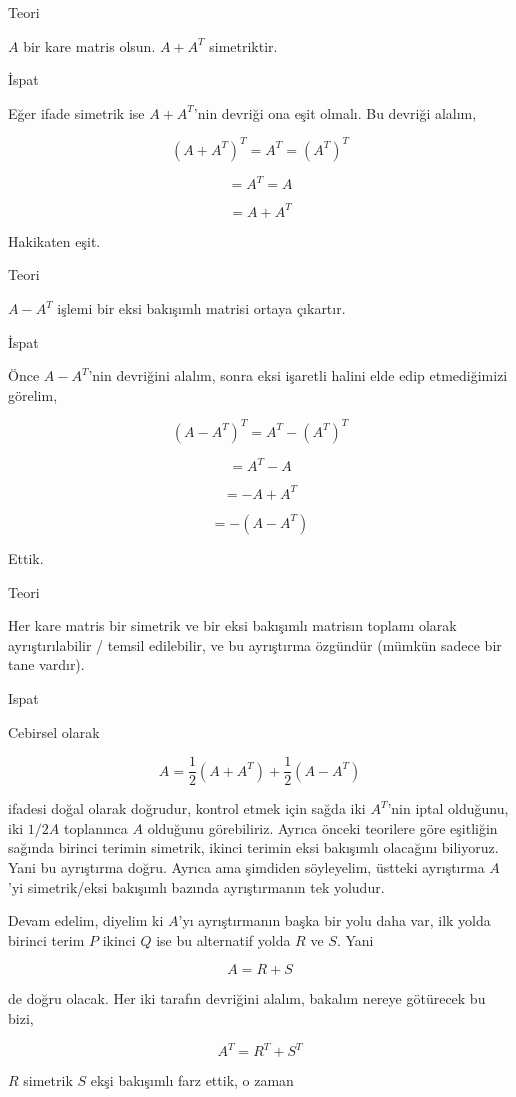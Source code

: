 \documentclass[12pt,fleqn]{article}\usepackage{../../common}
\begin{document}
Teori

$A$ bir kare matris olsun. $A + A^T$ simetriktir.

İspat

Eğer ifade simetrik ise $A + A^T$'nin devriği ona eşit olmalı. Bu devriği alalım,

$$
(A + A^T)^T = A^T = (A^T)^T
$$

$$
= A^T = A
$$

$$
= A + A^T
$$

Hakikaten eşit. 

Teori

$A - A^T$ işlemi bir eksi bakışımlı matrisi ortaya çıkartır.

İspat

Önce $A - A^T$'nin devriğini alalım, sonra eksi işaretli halini elde
edip etmediğimizi görelim,

$$
(A-A^T)^T = A^T - (A^T)^T
$$

$$
= A^T - A
$$

$$
= -A + A^T
$$

$$
= - (A-A^T)
$$

Ettik.

Teori

Her kare matris bir simetrik ve bir eksi bakışımlı matrisın toplamı olarak
ayrıştırılabilir / temsil edilebilir, ve bu ayrıştırma özgündür (mümkün sadece
bir tane vardır).

Ispat

Cebirsel olarak

$$
A = \frac{1}{2} (A + A^T) + \frac{1}{2} (A - A^T)
$$

ifadesi doğal olarak doğrudur, kontrol etmek için sağda iki $A^T$'nin iptal
olduğunu, iki $1/2 A$ toplanınca $A$ olduğunu görebiliriz. Ayrıca önceki
teorilere göre eşitliğin sağında birinci terimin simetrik, ikinci terimin eksi
bakışımlı olacağını biliyoruz. Yani bu ayrıştırma doğru. Ayrıca ama şimdiden
söyleyelim, üstteki ayrıştırma $A$'yi simetrik/eksi bakışımlı bazında
ayrıştırmanın tek yoludur.

Devam edelim, diyelim ki $A$'yı ayrıştırmanın başka bir yolu daha var, ilk yolda
birinci terim $P$ ikinci $Q$ ise bu alternatif yolda $R$ ve $S$. Yani

$$
A = R + S
$$

de doğru olacak. Her iki tarafın devriğini alalım, bakalım nereye götürecek
bu bizi,

$$
A^T = R^T + S^T
$$

$R$ simetrik $S$ ekşi bakışımlı farz ettik, o zaman
\end{document}
